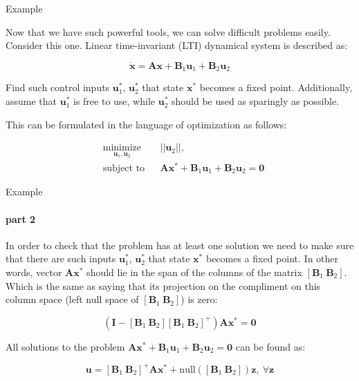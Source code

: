 \documentclass{beamer}
\begin{document}
\begin{frame}{Example}
\begin{flushleft}

Now that we have such powerful tools, we can solve difficult problems easily. Consider this one. Linear time-invariant (LTI) dynamical system is described as:

\begin{equation}
    \dot{\mathbf{x}} = \mathbf{A} \mathbf{x} + \mathbf{B}_1 \mathbf{u}_1 + \mathbf{B}_2 \mathbf{u}_2
\end{equation}

Find such control inputs $\mathbf{u}^*_1$, $\mathbf{u}^*_2$ that state $\mathbf{x}^*$ becomes a fixed point. Additionally, assume that $\mathbf{u}^*_1$ is free to use, while $\mathbf{u}^*_2$ should be used as sparingly as possible.

\bigskip

This can be formulated in the language of optimization as follows:

\begin{equation}
\begin{aligned}
& \underset{\mathbf{u}_1, \mathbf{u}_2}{\text{minimize}}
& & || \mathbf{u}_2 ||, \\
& \text{subject to}
& & \mathbf{A} \mathbf{x}^* + \mathbf{B}_1 \mathbf{u}_1 + \mathbf{B}_2 \mathbf{u}_2 = \mathbf{0}
\end{aligned}
\end{equation}

\end{flushleft}
\end{frame}


\begin{frame}{Example}
\framesubtitle{part 2}
\begin{flushleft}

In order to check that the problem has at least one solution we need to make sure that there are such inputs $\mathbf{u}^*_1$, $\mathbf{u}^*_2$ that state $\mathbf{x}^*$ becomes a fixed point. In other words, vector $\mathbf{A}\mathbf{x}^*$ should lie in the span of the columns of the matrix $[\mathbf{B}_1 \ \mathbf{B}_2]$. Which is the same as saying that its projection on the compliment on this column space (left null space of $[\mathbf{B}_1 \ \mathbf{B}_2]$) is zero:

\begin{equation}
    (\mathbf{I} - [\mathbf{B}_1 \ \mathbf{B}_2] [\mathbf{B}_1 \ \mathbf{B}_2]^+) \mathbf{A}\mathbf{x}^* = \mathbf{0}
\end{equation}

All solutions to the problem $\mathbf{A} \mathbf{x}^* + \mathbf{B}_1 \mathbf{u}_1 + \mathbf{B}_2 \mathbf{u}_2 = \mathbf{0}$ can be found as:

\begin{equation}
    \mathbf{u} = [\mathbf{B}_1 \ \mathbf{B}_2]^+ \mathbf{A}\mathbf{x}^* + \text{null}([\mathbf{B}_1 \ \mathbf{B}_2])\mathbf{z}, \ \forall \mathbf{z}
\end{equation}

\end{flushleft}
\end{frame}
\end{document}
